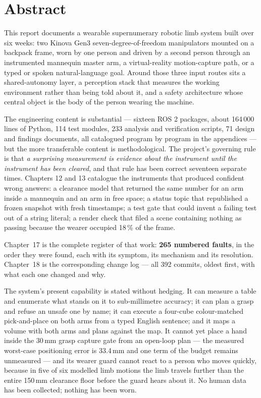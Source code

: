\documentclass[11pt,a4paper,oneside]{report}
\begin{document}
\chapter*{Abstract}

This report documents a wearable supernumerary robotic limb system built over
six weeks: two Kinova Gen3 seven-degree-of-freedom manipulators mounted on a
backpack frame, worn by one person and driven by a second person through an
instrumented mannequin master arm, a virtual-reality motion-capture path, or a
typed or spoken natural-language goal. Around those three input routes sits a
shared-autonomy layer, a perception stack that measures the working
environment rather than being told about it, and a safety architecture whose
central object is the body of the person wearing the machine.

The engineering content is substantial --- sixteen ROS 2 packages, about
164\,000 lines of Python, 114 test modules, 233 analysis and verification
scripts, 71 design and findings documents, all catalogued program by program in
the appendices --- but the more transferable content is methodological. The project's governing rule is that
\emph{a surprising measurement is evidence about the instrument until the
instrument has been cleared}, and that rule has been correct seventeen
separate times. Chapters 12 and 13 catalogue the instruments that produced
confident wrong answers: a clearance model that returned the same number for
an arm inside a mannequin and an arm in free space; a status topic that
republished a frozen snapshot with fresh timestamps; a test gate that could
invent a failing test out of a string literal; a render check that filed a
scene containing nothing as passing because the wearer occupied 18\,\% of the
frame.

Chapter~17 is the complete register of that work: \textbf{265 numbered
faults}, in the order they were found, each with its symptom, its mechanism and
its resolution. Chapter~18 is the corresponding change log --- all 392 commits,
oldest first, with what each one changed and why.

The system's present capability is stated without hedging. It can measure a
table and enumerate what stands on it to sub-millimetre accuracy; it can plan
a grasp and refuse an unsafe one by name; it can execute a four-cube
colour-matched pick-and-place on both arms from a typed English sentence; and
it maps a volume with both arms and plans against the map. It cannot yet place
a hand inside the 30\,mm grasp capture gate from an open-loop plan --- the
measured worst-case positioning error is 33.4\,mm and one term of the budget
remains unmeasured --- and its wearer guard cannot react to a person who moves
quickly, because in five of six modelled limb motions the limb travels further
than the entire 150\,mm clearance floor before the guard hears about it. No
human data has been collected; nothing has been worn.
\end{document}

